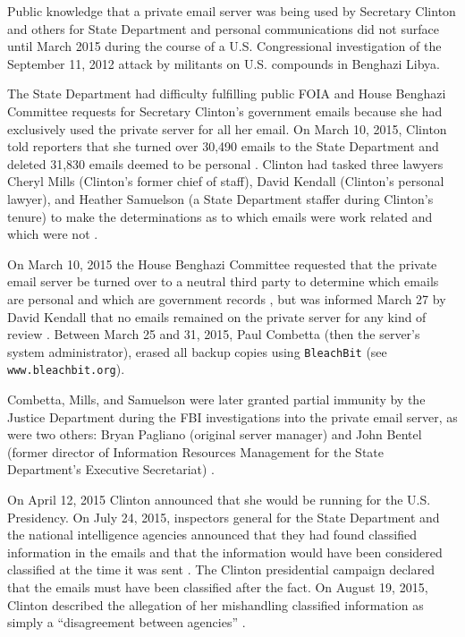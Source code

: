 \documentclass[journal]{vgtc}                %
\begin{document}
Public knowledge that a private email server was being used by Secretary Clinton and others for State Department and personal communications did not surface until March 2015 \cite{NewYorkTimes2015} during the course of a U.S. Congressional investigation \cite{BenghaziReport} of the September 11, 2012 attack by militants on U.S. compounds in Benghazi Libya.  

The State Department had difficulty fulfilling public FOIA and House Benghazi Committee requests \cite{TakingRootWashPost} for Secretary Clinton's government emails because she had exclusively used the private server for all her email.  On March 10, 2015,  Clinton told reporters that she turned over 30,490 emails to the State Department and deleted 31,830 emails deemed to be personal \cite{WashPostTimeline}.    Clinton had tasked three lawyers Cheryl Mills (Clinton's former chief of staff),  David Kendall (Clinton's personal lawyer), and Heather Samuelson (a State Department staffer during Clinton's tenure) to make the determinations as to which emails were work related and which were not \cite{emailVetting, thompsonTimeline}.   

On March 10, 2015 the House Benghazi Committee requested that the private email server be turned over to a neutral third party to determine which emails are personal and which are government records \cite{serverRequest}, but was informed March 27 by David Kendall that no emails remained on the private server for any kind of review \cite{serverScrubbedLawyer}.
Between March 25 and 31, 2015, Paul Combetta (then the server's system administrator), erased all backup copies using \texttt{BleachBit} (see \texttt{www.bleachbit.org}).    

Combetta, Mills, and Samuelson were later granted partial immunity by the Justice Department during the FBI investigations into the private email server, as were two others: Bryan Pagliano (original server manager) and  John Bentel (former director of Information Resources Management for the State Department's Executive Secretariat) \cite{immunityPolitico, immunityDailyCaller, immunityIT}.  

On April 12, 2015 Clinton announced that she would be running for the U.S. Presidency.  On July 24, 2015, inspectors general for the State Department  and the national intelligence agencies announced that they had found classified information in the emails and that the information would have been considered classified at the time it was sent \cite{serverClassified}.  The Clinton presidential campaign declared that the emails must have been classified after the fact. On August 19, 2015, Clinton described the allegation of her mishandling classified information as simply a ``disagreement between agencies'' \cite{clintonDenialGuardian}.
\end{document}
